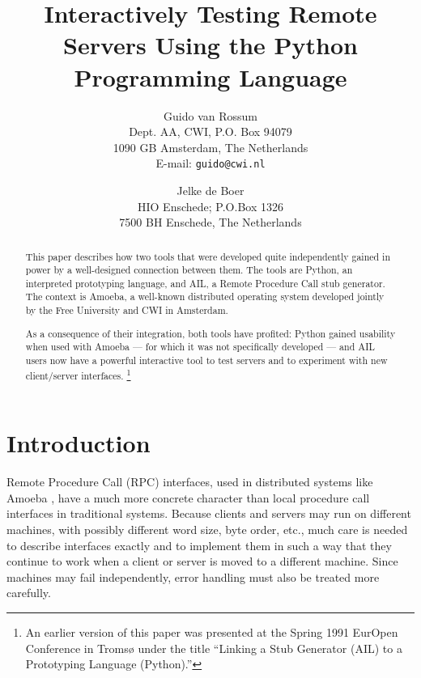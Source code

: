 \newcommand{\Cpp}{C\protect\raisebox{.18ex}{++}}

\title{
Interactively Testing Remote Servers Using the Python Programming Language
}

\author{
	Guido van Rossum \\
	Dept. AA, CWI, P.O. Box 94079 \\
	1090 GB Amsterdam, The Netherlands \\
	E-mail: {\tt guido@cwi.nl}
\and
	Jelke de Boer \\
	HIO Enschede; P.O.Box 1326 \\
	7500 BH  Enschede, The Netherlands
}



\maketitle

\begin{abstract}
This paper describes how two tools that were developed quite
independently gained in power by a well-designed connection between
them.  The tools are Python, an interpreted prototyping language, and
AIL, a Remote Procedure Call stub generator.  The context is Amoeba, a
well-known distributed operating system developed jointly by the Free
University and CWI in Amsterdam.

As a consequence of their integration, both tools have profited:
Python gained usability when used with Amoeba --- for which it was not
specifically developed --- and AIL users now have a powerful
interactive tool to test servers and to experiment with new
client/server interfaces.%
\footnote{
An earlier version of this paper was presented at the Spring 1991
EurOpen Conference in Troms{\o} under the title ``Linking a Stub
Generator (AIL) to a Prototyping Language (Python).''
}
\end{abstract}

\section{Introduction}

Remote Procedure Call (RPC) interfaces, used in distributed systems
like Amoeba
\cite{Amoeba:IEEE,Amoeba:CACM},
have a much more concrete character than local procedure call
interfaces in traditional systems.  Because clients and servers may
run on different machines, with possibly different word size, byte
order, etc., much care is needed to describe interfaces exactly and to
implement them in such a way that they continue to work when a client
or server is moved to a different machine.  Since machines may fail
independently, error handling must also be treated more carefully.

